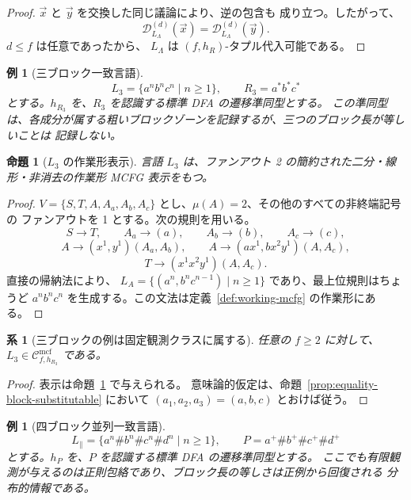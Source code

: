 \documentclass[11pt,a4paper]{ltjsarticle}
\newtheorem{proposition}[theorem]{命題}
\newtheorem{corollary}[theorem]{系}
\newtheorem{example}[theorem]{例}
\theoremstyle{remark}
\newcommand{\Cmcf}[2]{\mathcal{C}^{\mathrm{mcf}}_{#1,#2}}
\newcommand{\D}{\mathcal{D}}
\newcommand{\tuple}[1]{\vec{#1}}
\begin{document}
\begin{proof}
\(\tuple x\) と \(\tuple y\) を交換した同じ議論により、逆の包含も
成り立つ。したがって、
\[
  \D_{L_\Lambda}^{(d)}(\tuple x)
  =
  \D_{L_\Lambda}^{(d)}(\tuple y).
\]
\(d\le f\) は任意であったから、
\(L_\Lambda\) は \((f,h_R)\)-タプル代入可能である。
\end{proof}


\begin{example}[三ブロック一致言語]
\label{ex:l3-language}
\[
  L_3=\{a^n b^n c^n\mid n\ge1\},
  \qquad R_3=a^*b^*c^*
\]
とする。\(h_{R_3}\) を、\(R_3\) を認識する標準 DFA の遷移準同型とする。
この準同型は、各成分が属する粗いブロックゾーンを記録するが、三つのブロック長が等しいことは
記録しない。
\end{example}

\begin{proposition}[\(L_3\) の作業形表示]
\label{prop:l3-running-example}
言語 \(L_3\) は、ファンアウト 2 の簡約された二分・線形・非消去の作業形 MCFG 表示をもつ。
\end{proposition}

\begin{proof}
\(V=\{S,T,A,A_a,A_b,A_c\}\) とし、\(\mu(A)=2\)、その他のすべての非終端記号の
ファンアウトを 1 とする。次の規則を用いる。
\[
  S\to T,\qquad A_a\to(a),\qquad A_b\to(b),\qquad A_c\to(c),
\]
\[
  A\to(x^1,y^1)(A_a,A_b),\qquad
  A\to(a x^1,b x^2 y^1)(A,A_c),
\]
\[
  T\to(x^1x^2y^1)(A,A_c).
\]
直接の帰納法により、
\(L_A=\{(a^n,b^n c^{n-1})\mid n\ge1\}\) であり、最上位規則はちょうど
\(a^n b^n c^n\) を生成する。この文法は定義~\ref{def:working-mcfg} の作業形にある。
\end{proof}

\begin{corollary}[三ブロックの例は固定観測クラスに属する]
\label{cor:l3-in-fixed-observation-class}
任意の \(f\ge2\) に対して、\(L_3\in\Cmcf{f}{h_{R_3}}\) である。
\end{corollary}

\begin{proof}
表示は命題~\ref{prop:l3-running-example} で与えられる。
意味論的仮定は、命題~\ref{prop:equality-block-substitutable} において
\((a_1,a_2,a_3)=(a,b,c)\) とおけば従う。
\end{proof}

\begin{example}[四ブロック並列一致言語]
\label{ex:parallel-language}
\[
  L_{\parallel}=\{a^n\#b^n\#c^n\#d^n\mid n\ge1\},
  \qquad P=a^+\#b^+\#c^+\#d^+
\]
とする。\(h_P\) を、\(P\) を認識する標準 DFA の遷移準同型とする。
ここでも有限観測が与えるのは正則包絡であり、ブロック長の等しさは正例から回復される
分布的情報である。
\end{example}
\end{document}
